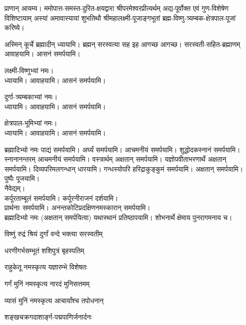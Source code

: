 

प्राणान् आयम्य। ममोपात्त-समस्त-दुरित-क्षयद्वारा श्रीपरमेश्वरप्रीत्यर्थम् अद्य-पूर्वोक्त एवं गुण-विशेषेण विशिष्टायाम् अस्यां
अमावास्यायां शुभतिथौ श्रीमहालक्ष्मी-पूजाङ्गभूतां ब्रह्म-विष्णु-त्र्यम्बक-क्षेत्रपाल-पूजां करिष्ये।

अस्मिन् कूर्चे ब्रह्मादीन् ध्यायामि। ब्रह्मन् सरस्वत्या सह इह आगच्छ आगच्छ। सरस्वती-सहित-ब्रह्माणम् आवाहयामि। आसनं समर्पयामि।

लक्ष्मी-विष्णुभ्यां नमः।\\
ध्यायामि। आवाहयामि। आसनं समर्पयामि।

दुर्गा-त्र्यम्बकाभ्यां नमः।\\
ध्यायामि। आवाहयामि। आसनं समर्पयामि।

क्षेत्रपाल-भूमिभ्यां नमः।\\
ध्यायामि। आवाहयामि। आसनं समर्पयामि।

ब्रह्मादिभ्यो नमः पाद्यं समर्पयामि। अर्घ्यं समर्पयामि।
आचमनीयं समर्पयामि। शुद्धोदकस्नानं समर्पयामि। स्नानानन्तरम् आचमनीयं समर्पयामि।
वस्त्रार्थम् अक्षतान् समर्पयामि।
यज्ञोपवीताभरणार्थे अक्षतान् समर्पयामि।
दिव्यपरिमलगन्धान् धारयामि।
गन्धस्योपरि हरिद्राकुङ्कुमं समर्पयामि। अक्षतान् समर्पयामि। \\
पुष्पैः पूजयामि।\\

नैवेद्यम्। \\
कर्पूरताम्बूलं समर्पयामि। कर्पूरनीराजनं दर्शयामि।\\
प्रार्थनाः समर्पयामि।
अनन्तकोटिप्रदक्षिणनमस्कारान् समर्पयामि।\\

ब्रह्मादिभ्यो नमः (अक्षतान् समर्पयित्वा) यथास्थानं प्रतिष्ठापयामि। शोभनार्थे क्षेमाय पुनरागमनाय च।


{विष्णुं रुद्रं श्रियं दुर्गां वन्दे भक्त्या सरस्वतीम्}

{धरणीगर्भसम्भूतं शशिपुत्रं बृहस्पतिम्}

{राहुकेतू नमस्कृत्य यज्ञारम्भे विशेषतः}

{गर्गं मुनिं नमस्कृत्य नारदं मुनिसत्तमम्}

{व्यासं मुनिं नमस्कृत्य आचार्यांश्च तपोधनान्}

{शङ्खचक्रगदाशार्ङ्ग-पद्मपाणिर्जनार्दनः}

